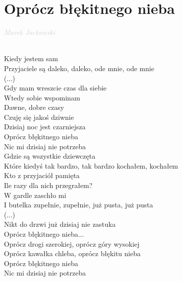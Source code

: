 \documentclass[a5paper, 10pt]{book}
\begin{document}
\section{Oprócz błękitnego nieba}\textcolor{lightgray}{\textit{Marek Jackowski}}\\~\\
\begin{minipage}[t]{0.8\textwidth}
  Kiedy jestem sam\\
  Przyjaciele są daleko, daleko, ode mnie, ode mnie\\
  (...)~\\
  Gdy mam wreszcie czas dla siebie\\

  Wtedy sobie wspominam\\
  Dawne, dobre czasy\\
  Czuję się jakoś dziwnie\\
  Dzisiaj noc jest czarniejsza\\

  \hspace*{5mm}Oprócz błękitnego nieba\\
  \hspace*{5mm}Nic mi dzisiaj nie potrzeba\\

  Gdzie są wszystkie dziewczęta\\
  Które kiedyś tak bardzo, tak bardzo kochałem, kochałem\\
  Kto z przyjaciół pamięta\\
  Ile razy dla nich przegrałem?\\

  W gardle zaschło mi\\
  I butelka zupełnie, zupełnie, już pusta, już pusta\\
  (...)\\
  Nikt do drzwi już dzisiaj nie zastuka\\

  \hspace*{5mm}Oprócz błękitnego nieba...\\

  \hspace*{5mm}Oprócz drogi szerokiej, oprócz góry wysokiej\\
  \hspace*{5mm}Oprócz kawałka chleba, oprócz błękitu nieba\\
  \hspace*{5mm}Oprócz błękitnego nieba\\
  \hspace*{5mm}Nic mi dzisiaj nie potrzeba\\

\end{minipage}
\end{document}
